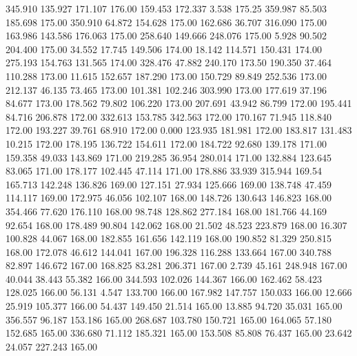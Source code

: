  345.910  135.927  171.107       176.00
 159.453  172.337    3.538       175.25
 359.987   85.503  185.698       175.00
 350.910   64.872  154.628       175.00
 162.686   36.707  316.090       175.00
 163.986  143.586  176.063       175.00
 258.640  149.666  248.076       175.00
   5.928   90.502  204.400       175.00
  34.552   17.745  149.506       174.00
  18.142  114.571  150.431       174.00
 275.193  154.763  131.565       174.00
 328.476   47.882  240.170       173.50
 190.350   37.464  110.288       173.00
  11.615  152.657  187.290       173.00
 150.729   89.849  252.536       173.00
 212.137   46.135   73.465       173.00
 101.381  102.246  303.990       173.00
 177.619   37.196   84.677       173.00
 178.562   79.802  106.220       173.00
 207.691   43.942   86.799       172.00
 195.441   84.716  206.878       172.00
 332.613  153.785  342.563       172.00
 170.167   71.945  118.840       172.00
 193.227   39.761   68.910       172.00
   0.000  123.935  181.981       172.00
 183.817  131.483   10.215       172.00
 178.195  136.722  154.611       172.00
 184.722   92.680  139.178       171.00
 159.358   49.033  143.869       171.00
 219.285   36.954  280.014       171.00
 132.884  123.645   83.065       171.00
 178.177  102.445   47.114       171.00
 178.886   33.939  315.944       169.54
 165.713  142.248  136.826       169.00
 127.151   27.934  125.666       169.00
 138.748   47.459  114.117       169.00
 172.975   46.056  102.107       168.00
 148.726  130.643  146.823       168.00
 354.466   77.620  176.110       168.00
  98.748  128.862  277.184       168.00
 181.766   44.169   92.654       168.00
 178.489   90.804  142.062       168.00
  21.502   48.523  223.879       168.00
  16.307  100.828   44.067       168.00
 182.855  161.656  142.119       168.00
 190.852   81.329  250.815       168.00
 172.078   46.612  144.041       167.00
 196.328  116.288  133.664       167.00
 340.788   82.897  146.672       167.00
 168.825   83.281  206.371       167.00
   2.739   45.161  248.948       167.00
  40.044   38.443   55.382       166.00
 344.593  102.026  144.367       166.00
 162.462   58.423  128.025       166.00
  56.131    4.547  133.700       166.00
 167.982  147.757  150.033       166.00
  12.666   25.919  105.377       166.00
  54.437  149.450   21.514       165.00
  13.885   94.720   35.031       165.00
 356.557   96.187  153.186       165.00
 268.687  103.780  150.721       165.00
 164.065   57.180  152.685       165.00
 336.680   71.112  185.321       165.00
 153.508   85.808   76.437       165.00
  23.642   24.057  227.243       165.00
